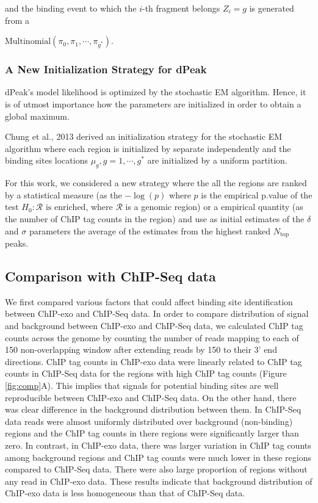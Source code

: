\documentclass[11pt]{article}\usepackage[]{graphicx}\usepackage[]{color}
\begin{document}
and the binding event to which the $i$-th fragment belongs $Z_i = g$
is generated from a

$\mbox{Multinomial}(\pi_0,\pi_1,\cdots,\pi_{g^*})$.

\subsubsection{A New Initialization Strategy for dPeak}
\label{sec:algo}

dPeak's model likelihood is optimized by the stochastic EM
algorithm. Hence, it is of utmost importance how the parameters are
initialized in order to obtain a global maximum.

Chung et al., 2013 \cite{dpeak} derived an initialization strategy for
the stochastic EM algorithm where each region is initialized by
separate independently and the binding sites locations $\mu_g,
g=1,\cdots,g^*$ are initialized by a uniform partition.

For this work, we considered a new strategy where the all the regions
are ranked by a statistical measure (as the $-\log(p)$ where $p$ is
the empirical p.value of the test $H_0: \mathcal{R} \text{ is
  enriched}$, where $\mathcal{R}$ is a genomic region) or a empirical
quantity (as the number of ChIP tag counts in the region) and use as
initial estimates of the $\delta$ and $\sigma$ parameters the average
of the estimates from the highest ranked $N_{\text{top}}$ peaks.

\subsection{Comparison with ChIP-Seq data}
\label{sec:comp_chipseq}



We first compared various factors that could affect binding site
identification between ChIP-exo and ChIP-Seq data. In order to compare
distribution of signal and background between ChIP-exo and ChIP-Seq
data, we calculated ChIP tag counts across the genome by counting the
number of reads mapping to each of 150 non-overlapping
window after extending reads by 150 to their 3' end
directions. ChIP tag counts in ChIP-exo data were linearly related to
ChIP tag counts in ChIP-Seq data for the regions with high ChIP tag
counts (Figure \ref{fig:comp}A). This implies that signals for
potential binding sites are well reproducible between ChIP-exo and
ChIP-Seq data. On the other hand, there was clear difference in the
background distribution between them. In ChIP-Seq data reads were
almost uniformly distributed over background (non-binding) regions and
the ChIP tag counts in there regions were significantly larger than
zero. In contrast, in ChIP-exo data, there was larger variation in
ChIP tag counts among background regions and ChIP tag counts were much
lower in these regions compared to ChIP-Seq data. There were also
large proportion of regions without any read in ChIP-exo data. These
results indicate that background distribution of ChIP-exo data is less
homogeneous than that of ChIP-Seq data.
\end{document}
